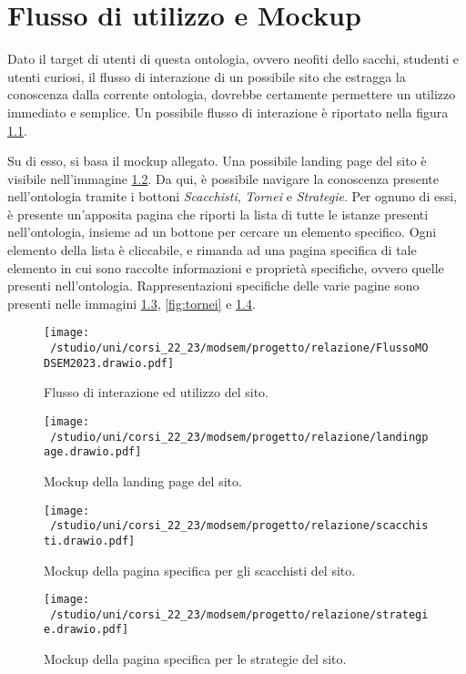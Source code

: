 \documentclass[12pt]{book}
\begin{document}
\chapter{Flusso di utilizzo e Mockup}

Dato il target di utenti di questa ontologia, ovvero neofiti dello
sacchi, studenti e utenti curiosi, il flusso di interazione di un 
possibile sito che estragga la conoscenza dalla corrente ontologia, dovrebbe
certamente permettere un utilizzo immediato e semplice. Un possibile
flusso di interazione è riportato nella figura \ref{fig:flusso}. 

Su di esso, si basa il mockup allegato. Una possibile landing page del
sito è visibile nell'immagine \ref{fig:landing}. Da qui, è possibile
navigare la conoscenza presente nell'ontologia tramite i bottoni
\textit{Scacchisti}, \textit{Tornei} e \textit{Strategie}. Per ognuno
di essi, è presente un'apposita pagina che riporti la lista di tutte
le istanze presenti nell'ontologia, insieme ad un bottone per cercare
un elemento specifico. Ogni elemento della lista è cliccabile, e
rimanda ad una pagina specifica di tale elemento in cui sono raccolte
informazioni e proprietà specifiche, ovvero quelle presenti
nell'ontologia. Rappresentazioni specifiche delle varie pagine sono
presenti nelle immagini \ref{fig:scacchisti}, \ref{fig:tornei} e \ref{fig:strategie}.

\begin{figure}[h]
  \caption{Flusso di interazione ed utilizzo del sito.}
  \centering
  \label{fig:flusso}
  \texttt{[image: ~/studio/uni/corsi\_22\_23/modsem/progetto/relazione/FlussoMODSEM2023.drawio.pdf]}
\end{figure}

\begin{figure}[h]
  \caption{Mockup della landing page del sito.}
  \centering
  \label{fig:landing}
  \texttt{[image: ~/studio/uni/corsi\_22\_23/modsem/progetto/relazione/landingpage.drawio.pdf]}
\end{figure} 

\begin{figure}[h]
  \caption{Mockup della pagina specifica per gli scacchisti del sito.}
  \centering
\label{fig:scacchisti}
  \texttt{[image: ~/studio/uni/corsi\_22\_23/modsem/progetto/relazione/scacchisti.drawio.pdf]}
\end{figure} 

\begin{figure}[h]
  \caption{Mockup della pagina specifica per le strategie del sito.}
  \centering
\label{fig:strategie}
  \texttt{[image: ~/studio/uni/corsi\_22\_23/modsem/progetto/relazione/strategie.drawio.pdf]}
\end{figure} 
\end{document}
